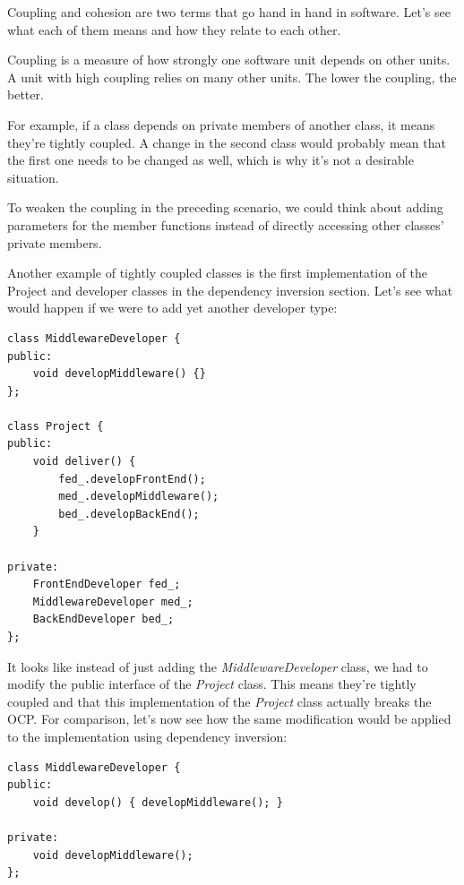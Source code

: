 
Coupling and cohesion are two terms that go hand in hand in software. Let's see what each of them means and how they relate to each other.



Coupling is a measure of how strongly one software unit depends on other units. A unit with high coupling relies on many other units. The lower the coupling, the better.

For example, if a class depends on private members of another class, it means they're tightly coupled. A change in the second class would probably mean that the first one needs to be changed as well, which is why it's not a desirable situation. 

To weaken the coupling in the preceding scenario, we could think about adding parameters for the member functions instead of directly accessing other classes' private members.

Another example of tightly coupled classes is the first implementation of the Project and developer classes in the dependency inversion section. Let's see what would happen if we were to add yet another developer type:


\begin{lstlisting}[style=styleCXX]
class MiddlewareDeveloper {
public:
	void developMiddleware() {}
};

class Project {
public:
	void deliver() {
		fed_.developFrontEnd();
		med_.developMiddleware();
		bed_.developBackEnd();
	}

private:
	FrontEndDeveloper fed_;
	MiddlewareDeveloper med_;
	BackEndDeveloper bed_;
};
\end{lstlisting}

It looks like instead of just adding the \textit{MiddlewareDeveloper} class, we had to modify the public interface of the \textit{Project} class. This means they're tightly coupled and that this implementation of the \textit{Project} class actually breaks the OCP. For comparison, let's now see how the same modification would be applied to the implementation using dependency inversion:


\begin{lstlisting}[style=styleCXX]
class MiddlewareDeveloper {
public:
	void develop() { developMiddleware(); }
	
private:
	void developMiddleware();
};

\end{lstlisting}

